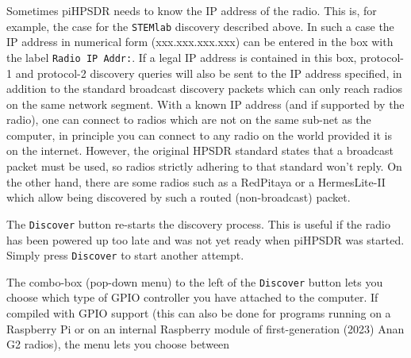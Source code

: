 \documentclass[12pt]{book}
\def\rett#1{\texttt{\color{red}#1}}
\def\pH{pi\-HPSDR\xspace}
\begin{document}
Sometimes \pH needs to know the IP address of the radio. This is, for example, the case for the
\texttt{STEMlab} discovery
described above. In such a case the IP address in numerical form (xxx.xxx.xxx.xxx) can be entered in the box
with the label \rett{Radio IP Addr:}. If a legal IP address is contained in this box, protocol-1 and
protocol-2 discovery queries
will also be sent to the IP address specified, in addition to the standard broadcast discovery packets which
can only reach
radios on the same network segment. With a known IP address (and if supported by the radio),  one can
connect to radios which are not on the same sub-net as the computer, in principle you can connect to any
radio on the world
provided it is on the internet. However, the original HPSDR standard states that a broadcast packet must be
used, so radios strictly adhering to that standard
won't reply. On the other hand, there are some radios such as a RedPitaya or a HermesLite-II which
allow being discovered by such a routed (non-broadcast) packet.

The \rett{Discover} button re-starts the discovery process. This is useful if the radio has been powered up
too late and
was not yet ready when \pH was started. Simply press \rett{Discover} to start another attempt.

The combo-box (pop-down menu) to the left of the \rett{Discover} button lets you choose which type of GPIO
controller you
have attached to the computer.  If compiled with GPIO support (this can also be done for
programs running on a Raspberry Pi or on an internal Raspberry module of first-generation (2023) Anan G2 radios),
the menu lets you choose between
\end{document}
